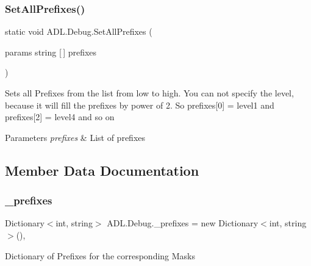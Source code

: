 \subsubsection{\texorpdfstring{Set\+All\+Prefixes()}{SetAllPrefixes()}}
{\footnotesize\ttfamily static void A\+D\+L.\+Debug.\+Set\+All\+Prefixes (\begin{DoxyParamCaption}\item[{params string \mbox{[}$\,$\mbox{]}}]{prefixes }\end{DoxyParamCaption})\hspace{0.3cm}{\ttfamily [static]}}



Sets all Prefixes from the list from low to high. You can not specify the level, because it will fill the prefixes by power of 2. So prefixes\mbox{[}0\mbox{]} = level1 and prefixes\mbox{[}2\mbox{]} = level4 and so on 


\begin{DoxyParams}{Parameters}
{\em prefixes} & List of prefixes\\
\hline
\end{DoxyParams}


\subsection{Member Data Documentation}
\mbox{\label{class_a_d_l_1_1_debug_ae158a8228eacba82054cb7b340153fe9}} 
\subsubsection{\texorpdfstring{\+\_\+prefixes}{\_prefixes}}
{\footnotesize\ttfamily Dictionary$<$int, string$>$ A\+D\+L.\+Debug.\+\_\+prefixes = new Dictionary$<$int, string$>$()\hspace{0.3cm}{\ttfamily [static]}, {\ttfamily [private]}}



Dictionary of Prefixes for the corresponding Masks 

\mbox{\label{class_a_d_l_1_1_debug_a5d5f16baa54da2aef4115a02a7253d40}} 
